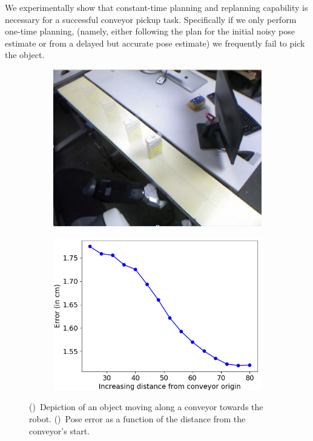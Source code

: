 \documentclass[a4paper,10pt]{article}
\begin{document}
%
We experimentally show that constant-time planning and replanning capability is necessary for a successful conveyor pickup task. Specifically if we only perform one-time planning, (namely, either following the plan for the initial noisy pose estimate or from a delayed but accurate pose estimate) we frequently fail to pick the object.
\begin{figure}[t]
    \centering
    \begin{subfigure}{.49\textwidth}
        \includegraphics[width=1.0\textwidth]{object_blur}
        \caption{}
        \label{fig:obj1}
    \end{subfigure}
    \begin{subfigure}{0.49\textwidth}
        \includegraphics[width=1.0\textwidth]{pose_error_f}
        \caption{}
        \label{fig:obj2}
    \end{subfigure}
    \caption{
    \CaptionTextSize
    ()~Depiction of an object moving along a conveyor towards the robot.
    ()~Pose error as a function of the distance from the conveyor's start.
    }
    \label{fig:pose_sequence}
\end{figure}
\end{document}
